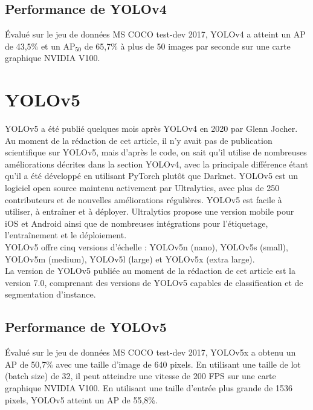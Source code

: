 \documentclass{article}
\begin{document}
\subsection{Performance de YOLOv4}

Évalué sur le jeu de données MS COCO test-dev 2017, YOLOv4 a atteint un AP de 43,5\% et un AP$_{50}$ de 65,7\% à plus de 50 images par seconde sur une carte graphique NVIDIA V100.

\section{YOLOv5}

YOLOv5 \cite{72} a été publié quelques mois après YOLOv4 en 2020 par Glenn Jocher. Au moment de la rédaction de cet article, il n'y avait pas de publication scientifique sur YOLOv5, mais d'après le code, on sait qu'il utilise de nombreuses améliorations décrites dans la section YOLOv4, avec la principale différence étant qu'il a été développé en utilisant PyTorch plutôt que Darknet.
YOLOv5 est un logiciel open source maintenu activement par Ultralytics, avec plus de 250 contributeurs et de nouvelles améliorations régulières. YOLOv5 est facile à utiliser, à entraîner et à déployer. Ultralytics propose une version mobile pour iOS et Android ainsi que de nombreuses intégrations pour l'étiquetage, l'entraînement et le déploiement.
\vspace{.2cm}\\
YOLOv5 offre cinq versions d'échelle : YOLOv5n (nano), YOLOv5s (small), YOLOv5m (medium), YOLOv5l (large) et YOLOv5x (extra large).
\vspace{.2cm}\\
La version de YOLOv5 publiée au moment de la rédaction de cet article est la version 7.0, comprenant des versions de YOLOv5 capables de classification et de segmentation d'instance.

\subsection{Performance de YOLOv5}
Évalué sur le jeu de données MS COCO test-dev 2017, YOLOv5x a obtenu un AP de 50,7\% avec une taille d'image de 640 pixels. En utilisant une taille de lot (batch size) de 32, il peut atteindre une vitesse de 200 FPS sur une carte graphique NVIDIA V100. En utilisant une taille d'entrée plus grande de 1536 pixels, YOLOv5 atteint un AP de 55,8\%.
\end{document}
